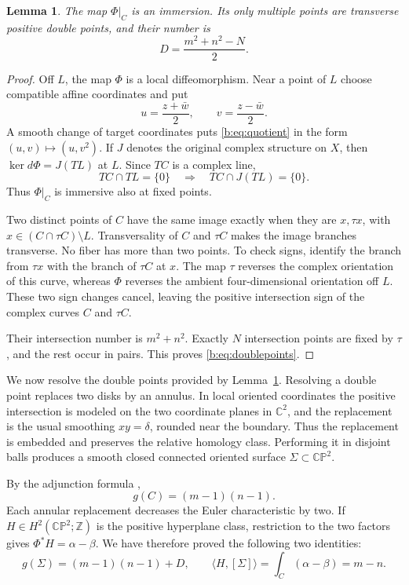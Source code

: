 \documentclass[UTF8,11pt]{ctexart}
\newtheorem{lem}[thm]{Lemma}
\theoremstyle{definition}
\numberwithin{equation}{section}
\newcommand{\C}{\mathbb C}\newcommand{\R}{\mathbb R}
\newcommand{\CP}{\mathbb {CP}}\newcommand{\cP}{\mathcal P}
\begin{document}
\begin{lem}\label{b:lem:immersion}
The map $\Phi|_C$ is an immersion. Its only multiple points are
transverse positive double points, and their number is
\begin{equation}\label{b:eq:doublepoints}
 D=\frac{m^2+n^2-N}{2}.
\end{equation}
\end{lem}
\begin{proof}
Off $L$, the map $\Phi$ is a local diffeomorphism. Near a point of $L$
choose compatible affine coordinates and put
\[
 u=\frac{z+\bar w}{2},\qquad v=\frac{z-\bar w}{2}.
\]
A smooth change of target coordinates puts \eqref{b:eq:quotient} in
the form $(u,v)\mapsto(u,v^2)$. If $J$ denotes the original complex
structure on $X$, then $\ker d\Phi=J(TL)$ at $L$. Since $TC$ is a
complex line,
\[
 TC\cap TL=\{0\}\quad\Longrightarrow\quad TC\cap J(TL)=\{0\}.
\]
Thus $\Phi|_C$ is immersive also at fixed points.

Two distinct points of $C$ have the same image exactly when they are
$x,\tau x$, with $x\in(C\cap\tau C)\setminus L$. Transversality of
$C$ and $\tau C$ makes the image branches transverse. No fiber has
more than two points. To check signs, identify the branch from
$\tau x$ with the branch of $\tau C$ at $x$. The map $\tau$ reverses
the complex orientation of this curve, whereas $\Phi$ reverses the
ambient four-dimensional orientation off $L$. These two sign changes
cancel, leaving the positive intersection sign of the complex curves
$C$ and $\tau C$.

Their intersection number is $m^2+n^2$. Exactly $N$ intersection
points are fixed by $\tau$, and the rest occur in pairs. This proves
\eqref{b:eq:doublepoints}.
\end{proof}

We now resolve the double points provided by Lemma~\ref{b:lem:immersion}.
Resolving a double point replaces two disks by an annulus. In local
oriented coordinates the positive intersection is modeled on the two
coordinate planes in $\C^2$, and the replacement is the usual smoothing
$xy=\delta$, rounded near the boundary. Thus the replacement is
embedded and preserves the relative homology class. Performing it in
disjoint balls produces a smooth closed connected oriented surface
$\Sigma\subset\CP^2$.

By the adjunction formula
\cite[Chapter~V, Proposition~1.5, p.~361]{Har77},
\[
 g(C)=(m-1)(n-1).
\]
Each annular replacement decreases the Euler characteristic by two.
If $H\in H^2(\CP^2;\mathbb Z)$ is the positive hyperplane class,
restriction to the two factors gives $\Phi^*H=\alpha-\beta$.
We have therefore proved the following two identities:
\begin{equation}\label{b:eq:surfaceinvariants}
 g(\Sigma)=(m-1)(n-1)+D,
 \qquad
 \langle H,[\Sigma]\rangle=\int_C(\alpha-\beta)=m-n.
\end{equation}
\end{document}
